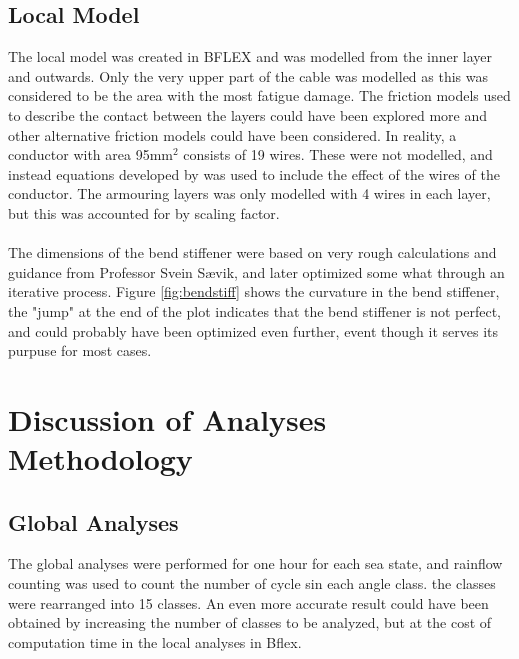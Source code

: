 \subsection{Local Model}
\label{sec:disclocmod}
The local model was created in BFLEX and was modelled from the inner layer and outwards. Only the very upper part of the cable was modelled as this was considered to be the area with the most fatigue damage. The friction models used to describe the contact between the layers could have been explored more and other alternative friction models could have been considered. In reality, a conductor with area 95mm$^2$ consists of 19 wires. These were not modelled, and instead equations developed by \cite{s300} was used to include the effect of the wires of the conductor. The armouring layers was only modelled with 4 wires in each layer, but this was accounted for by scaling factor. \\\\The dimensions of the bend stiffener were based on very rough calculations and guidance from Professor Svein Sævik, and later optimized some what through an iterative process. Figure \ref{fig:bendstiff} shows the curvature in the bend stiffener, the "jump" at the end of the plot indicates that the bend stiffener is not perfect, and could probably have been optimized even further, event though it serves its purpuse for most cases. 
\section{Discussion of Analyses Methodology}
\subsection{Global Analyses}
The global analyses were performed for one hour for each sea state, and rainflow counting was used to count the number of cycle sin each angle class. the classes were rearranged into 15 classes. An even more accurate result could have been obtained by increasing the number of classes to be analyzed, but at the cost of computation time in the local analyses in Bflex. 

 
